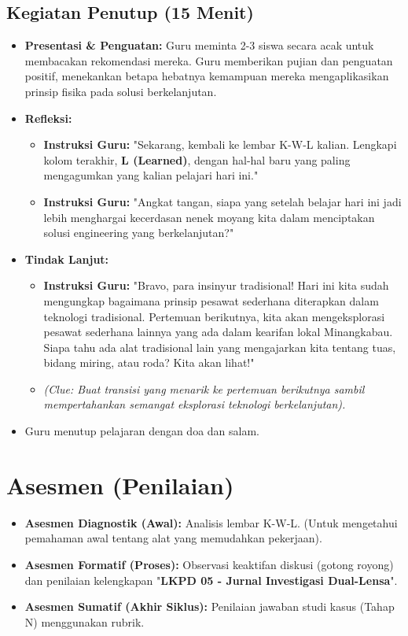 \documentclass[a4paper,12pt]{article}
\begin{document}
\subsection{Kegiatan Penutup (15 Menit)}
\begin{itemize}
\item \textbf{Presentasi \& Penguatan:} Guru meminta 2-3 siswa secara acak untuk membacakan rekomendasi mereka. Guru memberikan pujian dan penguatan positif, menekankan betapa hebatnya kemampuan mereka mengaplikasikan prinsip fisika pada solusi berkelanjutan.
\item \textbf{Refleksi:}
    \begin{itemize}
    \item \textbf{Instruksi Guru:} "Sekarang, kembali ke lembar K-W-L kalian. Lengkapi kolom terakhir, \textbf{L (Learned)}, dengan hal-hal baru yang paling mengagumkan yang kalian pelajari hari ini."
    \item \textbf{Instruksi Guru:} "Angkat tangan, siapa yang setelah belajar hari ini jadi lebih menghargai kecerdasan nenek moyang kita dalam menciptakan solusi engineering yang berkelanjutan?"
    \end{itemize}
\item \textbf{Tindak Lanjut:}
    \begin{itemize}
    \item \textbf{Instruksi Guru:} "Bravo, para insinyur tradisional! Hari ini kita sudah mengungkap bagaimana prinsip pesawat sederhana diterapkan dalam teknologi tradisional. Pertemuan berikutnya, kita akan mengeksplorasi pesawat sederhana lainnya yang ada dalam kearifan lokal Minangkabau. Siapa tahu ada alat tradisional lain yang mengajarkan kita tentang tuas, bidang miring, atau roda? Kita akan lihat!"
    \item \textit{(Clue: Buat transisi yang menarik ke pertemuan berikutnya sambil mempertahankan semangat eksplorasi teknologi berkelanjutan).}
    \end{itemize}
\item Guru menutup pelajaran dengan doa dan salam.
\end{itemize}

\section{Asesmen (Penilaian)}

\begin{itemize}
\item \textbf{Asesmen Diagnostik (Awal):} Analisis lembar K-W-L. (Untuk mengetahui pemahaman awal tentang alat yang memudahkan pekerjaan).
\item \textbf{Asesmen Formatif (Proses):} Observasi keaktifan diskusi (gotong royong) dan penilaian kelengkapan "\textbf{LKPD 05 - Jurnal Investigasi Dual-Lensa}".
\item \textbf{Asesmen Sumatif (Akhir Siklus):} Penilaian jawaban studi kasus (Tahap N) menggunakan rubrik.
\end{itemize}
\end{document}
